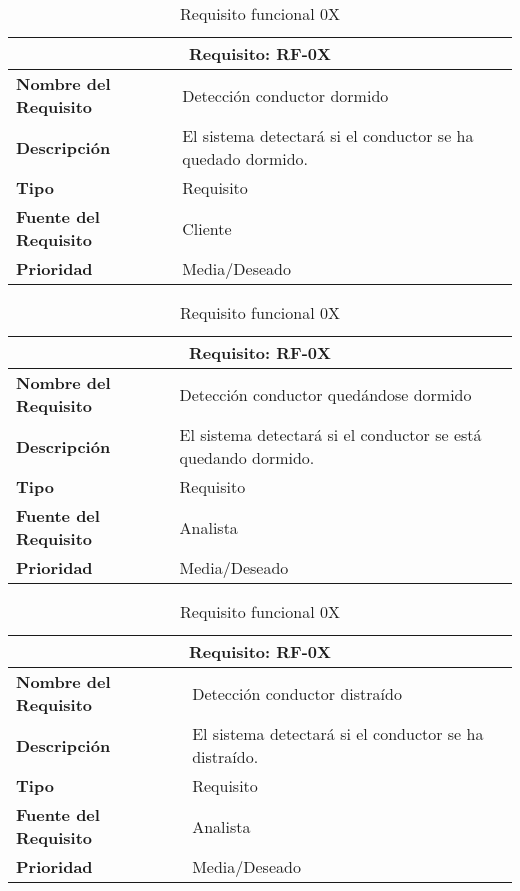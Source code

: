 \begin{table}[H]
\begin{center}
\begin{tabular}{p{} p{7cm}}
\multicolumn{2}{c}{\textbf{Requisito: RF-0X} } \\
\hline \hline
\textbf{Nombre del Requisito} & Detección conductor dormido\\
\hline
\textbf{Descripción} & El sistema detectará si el conductor se ha quedado dormido.\\
\hline
\textbf{Tipo} & Requisito  \\
\hline
\textbf{Fuente del Requisito} & Cliente  \\
\hline
\textbf{Prioridad} & Media/Deseado  \\ \hline
\end{tabular}
\caption{Requisito funcional 0X}
\label{tab:personal}
\end{center}
\end{table}

\begin{table}[H]
\begin{center}
\begin{tabular}{p{} p{7cm}}
\multicolumn{2}{c}{\textbf{Requisito: RF-0X} } \\
\hline \hline
\textbf{Nombre del Requisito} & Detección conductor quedándose dormido\\
\hline
\textbf{Descripción} & El sistema detectará si el conductor se está quedando dormido.\\
\hline
\textbf{Tipo} & Requisito  \\
\hline
\textbf{Fuente del Requisito} & Analista  \\
\hline
\textbf{Prioridad} & Media/Deseado  \\ \hline
\end{tabular}
\caption{Requisito funcional 0X}
\label{tab:personal}
\end{center}
\end{table}

\begin{table}[H]
\begin{center}
\begin{tabular}{p{} p{7cm}}
\multicolumn{2}{c}{\textbf{Requisito: RF-0X} } \\
\hline \hline
\textbf{Nombre del Requisito} & Detección conductor distraído\\
\hline
\textbf{Descripción} & El sistema detectará si el conductor se ha distraído.\\
\hline
\textbf{Tipo} & Requisito  \\
\hline
\textbf{Fuente del Requisito} & Analista  \\
\hline
\textbf{Prioridad} & Media/Deseado  \\ \hline
\end{tabular}
\caption{Requisito funcional 0X}
\label{tab:personal}
\end{center}
\end{table}

